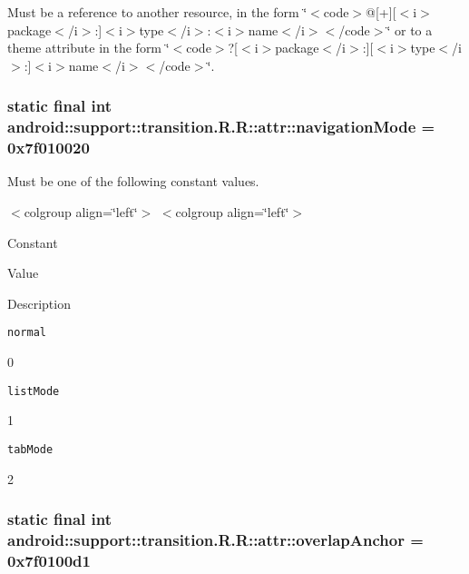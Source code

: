 Must be a reference to another resource, in the form \char`\"{}$<$code$>$@\mbox{[}+\mbox{]}\mbox{[}$<$i$>$package$<$/i$>$:\mbox{]}$<$i$>$type$<$/i$>$:$<$i$>$name$<$/i$>$$<$/code$>$\char`\"{} or to a theme attribute in the form \char`\"{}$<$code$>$?\mbox{[}$<$i$>$package$<$/i$>$:\mbox{]}\mbox{[}$<$i$>$type$<$/i$>$:\mbox{]}$<$i$>$name$<$/i$>$$<$/code$>$\char`\"{}. \hypertarget{classandroid_1_1support_1_1transition_1_1_r_1_1attr_4973f26730a5e3edcbc2a07095e185fb}{
\subsubsection[{navigationMode}]{\setlength{\rightskip}{0pt plus 5cm}static final int android::support::transition.R.R::attr::navigationMode = 0x7f010020}}
\label{classandroid_1_1support_1_1transition_1_1_r_1_1attr_4973f26730a5e3edcbc2a07095e185fb}


Must be one of the following constant values. \begin{TabularC}{0}
\hline
\end{TabularC}
$<$colgroup align=\char`\"{}left\char`\"{}$>$ $<$colgroup align=\char`\"{}left\char`\"{}$>$ 

Constant

Value

Description 

{\tt normal}

0

{\tt listMode}

1

{\tt tabMode}

2\hypertarget{classandroid_1_1support_1_1transition_1_1_r_1_1attr_d50ed87bb49050699d47badc4fe01485}{
\subsubsection[{overlapAnchor}]{\setlength{\rightskip}{0pt plus 5cm}static final int android::support::transition.R.R::attr::overlapAnchor = 0x7f0100d1}}
\label{classandroid_1_1support_1_1transition_1_1_r_1_1attr_d50ed87bb49050699d47badc4fe01485}


